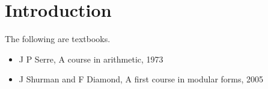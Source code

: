 

\newcommand{\twobytwosmall}[4]{
  \begin{psmallmatrix}
    #1 & #2 \\
    #3 & #4
  \end{psmallmatrix}
}





\section{Introduction}


The following are textbooks.
\begin{itemize}
\item J P Serre, A course in arithmetic, 1973
\item J Shurman and F Diamond, A first course in modular forms, 2005
\end{itemize}

